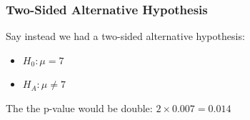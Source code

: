 \documentclass[handout]{beamer}
\newcommand{\blue}[1]{\textcolor{blue2}{#1}}
\newcommand{\xbar}{\overline{x}}
\begin{document}
%
%
%
%
%
%
%
%
%


\begin{frame}
\frametitle{Two-Sided Alternative Hypothesis}
Say instead we had a \blue{two-sided alternative hypothesis}:

\begin{itemize}
\item $H_0: \mu = 7$
\item $H_A: \mu \neq 7$
\end{itemize}

\pause The the p-value would be double: $2 \times 0.007= 0.014$

\vspace{4cm}

\end{frame}
\end{document}

